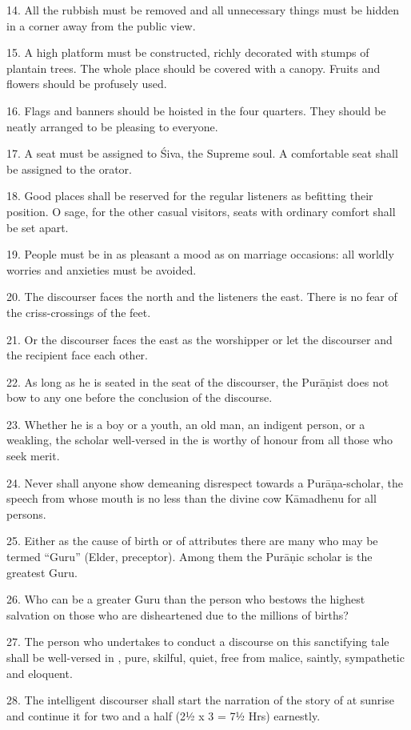 14. All the rubbish must be removed and all unnecessary things must be hidden in
a corner away from the public view.

15. A high platform must be constructed, richly decorated with stumps of
plantain trees. The whole place should be covered with a canopy. Fruits and
flowers should be profusely used.

16. Flags and banners should be hoisted in the four quarters. They should be
neatly arranged to be pleasing to everyone.

17. A seat must be assigned to Śiva, the Supreme soul. A comfortable seat shall
be assigned to the orator.

18. Good places shall be reserved for the regular listeners as befitting their
position. O sage, for the other casual visitors, seats with ordinary comfort
shall be set apart.

19. People must be in as pleasant a mood as on marriage occasions: all worldly
worries and anxieties must be avoided.

20. The discourser faces the north and the listeners the east. There is no fear
of the criss-crossings of the feet.

21. Or the discourser faces the east as the worshipper or let the discourser
and the recipient face each other.

22. As long as he is seated in the seat of the discourser, the Purāṇist does not
bow to any one before the conclusion of the discourse.

23. Whether he is a boy or a youth, an old man, an indigent person, or a weakling,
the scholar well-versed in the  is worthy of honour from all those
who seek merit.

24. Never shall anyone show demeaning disrespect towards a Purāṇa-scholar,
the speech from whose mouth is no less than the divine cow Kāmadhenu for all
persons.

25. Either as the cause of birth or of attributes there are many who may be
termed “Guru” (Elder, preceptor). Among them the Purāṇic scholar is the greatest
Guru.

26. Who can be a greater Guru than the person who bestows the highest salvation
on those who are disheartened due to the millions of births?

27. The person who undertakes to conduct a discourse on this sanctifying tale
shall be well-versed in , pure, skilful, quiet, free from malice,
saintly, sympathetic and eloquent.

28. The intelligent discourser shall start the narration of the story of
 at sunrise and continue it for two and a half 
(2½ x 3 = 7½ Hrs) earnestly.

